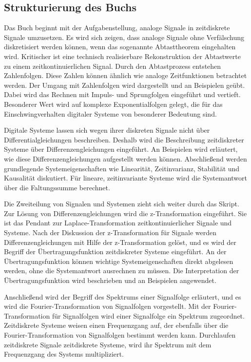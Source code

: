 \subsection{ Strukturierung des Buchs }

\noindent Das Buch beginnt mit der Aufgabenstellung, analoge Signale in zeitdiskrete Signale umzusetzen. Es wird sich zeigen, dass analoge Signale ohne Verf\"{a}lschung diskretisiert werden k\"{o}nnen, wenn das sogenannte Abtasttheorem eingehalten wird. Kritischer ist eine technisch realisierbare Rekonstruktion der Abtastwerte zu einem zeitkontinuierlichen Signal.\medskip
\noindent Durch den Abtastprozess entstehen Zahlenfolgen. Diese Zahlen k\"{o}nnen \"{a}hnlich wie analoge Zeitfunktionen betrachtet werden. Der Umgang mit Zahlenfolgen wird dargestellt und an Beispielen ge\"{u}bt. Dabei wird das Rechnen mit Impuls- und Sprungfolgen eingef\"{u}hrt und vertieft. Besonderer Wert wird auf komplexe Exponentialfolgen gelegt, die f\"{u}r das Einschwingverhalten digitaler Systeme von besonderer Bedeutung sind.\medskip

\noindent Digitale Systeme lassen sich wegen ihrer diskreten Signale nicht \"{u}ber Differentialgleichungen beschreiben. Deshalb wird die Beschreibung zeitdiskreter Systeme \"{u}ber Differenzengleichungen eingef\"{u}hrt. An Beispielen wird erl\"{a}utert, wie diese Differenzengleichungen aufgestellt werden k\"{o}nnen. Abschlie{\ss}end werden grundlegende Systemeigenschaften wie Linearit\"{a}t, Zeitinvarianz, Stabilit\"{a}t und Kausalit\"{a}t diskutiert. F\"{u}r lineare, zeitinvariante Systeme wird die Systemantwort \"{u}ber die Faltungssumme berechnet.\medskip

\noindent Die Zweiteilung von Signalen und Systemen zieht sich weiter durch das Skript. Zur L\"{o}sung von Differenzengleichungen wird die z-Transformation eingef\"{u}hrt. Sie ist das Pendant zur Laplace-Transformation zeitkontinuierlicher Signale und Systeme. Nach der Diskussion der z-Transformation f\"{u}r Signale werden Differenzengleichungen mit Hilfe der z-Transformation gel\"{o}st, und es wird der Begriff der \"{U}bertragungsfunktion zeitdiskreter Systeme eingef\"{u}hrt. An der \"{U}bertragungsfunktion k\"{o}nnen wichtige Systemeigenschaften direkt abgelesen werden, ohne die Systemantwort ausrechnen zu m\"{u}ssen. Die Interpretation der \"{U}bertragungsfunktion wird beschrieben und an Beispielen angewendet.\medskip

\noindent Anschlie{\ss}end wird der Begriff des Spektrums einer Signalfolge erl\"{a}utert, und es wird die Fourier-Transformation von Signalfolgen vorgestellt. Mit der Fourier-Transformation f\"{u}r Signalfolgen wird einer Signalfolge ein Spektrum zugeordnet. Zeitdiskrete Systeme weisen einen Frequenzgang auf, der ebenfalls \"{u}ber die Fourier-Transformation von Signalfolgen bestimmt werden kann. Durchlaufen zeitdiskrete Signale zeitdiskrete Systeme, wird ihr Spektrum mit dem Frequenzgang des Systems multipliziert.\medskip

